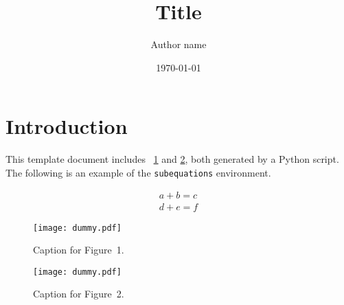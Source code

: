 \documentclass{article}
\begin{document}
\title{Title}
\author{Author name}
\date{\today}
\maketitle

\section{Introduction}\label{sec:introduction}
This template document includes \figurename~\ref{fig:template_figure1} and \ref{fig:template_figure2}, both generated by a Python script.
The following is an example of the \texttt{subequations} environment.

\begin{subequations}
\begin{gather}
a + b = c\\
d + e = f
\end{gather}
\end{subequations}

\begin{figure}[h]
    \centering
    \texttt{[image: dummy.pdf]}
    \caption{Caption for Figure~1.}
    \label{fig:template_figure1}
\end{figure}

\begin{figure}[h]
    \centering
    \texttt{[image: dummy.pdf]}
    \caption{Caption for Figure~2.}
    \label{fig:template_figure2}
\end{figure}
\end{document}
